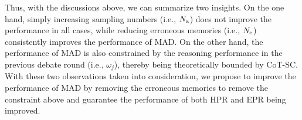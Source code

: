 \documentclass{article} %
\theoremstyle{plain}
\begin{document}
Thus, with the discussions above, we can summarize two insights. On the one hand, simply increasing sampling numbers (i.e., $N_{\rm a}$) does not improve the performance in all cases, while reducing erroneous memories (i.e., $N_{\rm e}$) consistently improves the performance of MAD. On the other hand, the performance of MAD is also constrained by the reasoning performance in the previous debate round (i.e., $\omega_j$), thereby being theoretically bounded by CoT-SC. With these two observations taken into consideration, we propose to improve the performance of MAD by removing the erroneous memories to remove the constraint above and guarantee the performance of both HPR and EPR being improved. %
\end{document}
